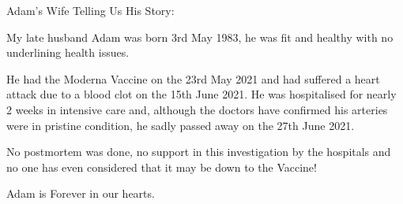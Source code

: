 Adam’s Wife Telling Us His Story:

My late husband Adam was born 3rd May 1983, he was fit and healthy with no
underlining health issues.

He had the Moderna Vaccine on the 23rd May 2021 and had suffered a heart attack
due to a blood clot on the 15th June 2021. He was hospitalised for nearly 2
weeks in intensive care and, although the doctors have confirmed his arteries
were in pristine condition, he sadly passed away on the 27th June 2021.

No postmortem was done, no support in this investigation by the hospitals and no
one has even considered that it may be down to the Vaccine!

Adam is Forever in our hearts.

